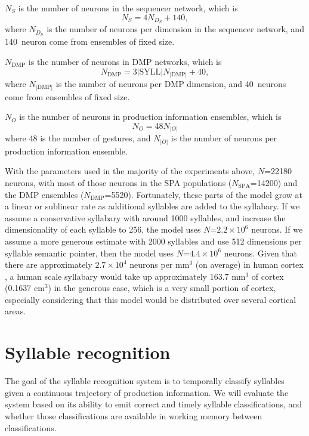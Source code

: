 $N_S$ is the number of neurons
in the sequencer network,
which is
\begin{equation}
  N_S = 4 N_D_S + 140,
\end{equation}
where $N_D_S$ is the number of neurons
per dimension in the sequencer network,
and 140~neuron come from ensembles
of fixed size.

$N_{\text{DMP}}$ is the number of neurons
in DMP networks, which is
\begin{equation}
  N_{\text{DMP}} = 3 |\text{SYLL}| N_{|\text{DMP}|} + 40,
\end{equation}
where $N_{|\text{DMP}|}$ is the number of neurons
per DMP dimension,
and 40~neurons come from ensembles of fixed size.

$N_O$ is the number of neurons
in production information ensembles, which is
\begin{equation}
  N_O = 48 N_{|O|}
\end{equation}
where 48 is the number of gestures,
and $N_{|O|}$ is the number of neurons
per production information ensemble.

With the parameters used
in the majority of the experiments above,
$N$=22180 neurons,
with most of those neurons
in the SPA populations
($N_{\text{SPA}}$=14200)
and the DMP ensembles ($N_{\text{DMP}}$=5520).
Fortunately, these parts of the model
grow at a linear or sublinear rate
as additional syllables are added
to the syllabary.
If we assume a conservative syllabary
with around 1000 syllables,
and increase the dimensionality
of each syllable to 256,
the model uses
$N$=$2.2 \times 10^6$ neurons.
If we assume a more generous estimate
with 2000 syllables
and use 512 dimensions
per syllable semantic pointer,
then the model uses
$N$=$4.4 \times 10^6$ neurons.
Given that there are approximately
$2.7 \times 10^4$ neurons per mm$^3$ (on average)
in human cortex \citep[BNID 112050]{milo2010},
a human scale syllabary would take up
approximately 163.7 mm$^3$ of cortex
(0.1637 cm$^3$)
in the generous case,
which is a very small portion of cortex,
especially considering that this model
would be distributed over
several cortical areas.

\section{Syllable recognition}

The goal of the syllable recognition system
is to temporally classify syllables
given a continuous trajectory
of production information.
We will evaluate the system
based on its ability to emit
correct and timely syllable classifications,
and whether those classifications
are available in working memory
between classifications.

